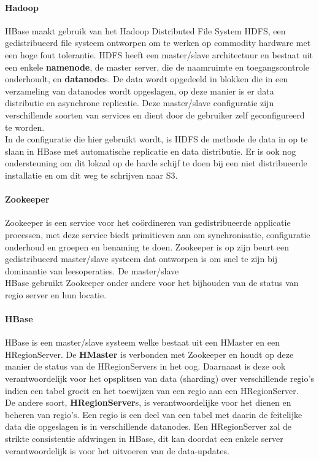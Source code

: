 \paragraph{Hadoop\cite{borthakur2007hadoop}} HBase maakt gebruik van het Hadoop Distributed File System \gls{HDFS}, een gedistribueerd file systeem ontworpen om te werken op commodity hardware met een hoge fout tolerantie. \gls{HDFS} heeft een master/slave architectuur en bestaat uit een enkele \textbf{namenode}, de master server, die de naamruimte en toegangscontrole onderhoudt, en \textbf{datanode}s. De data wordt opgedeeld in blokken die in een verzameling van datanodes wordt opgeslagen, op deze manier is er data distributie en asynchrone replicatie. Deze master/slave configuratie zijn verschillende soorten van services en dient door de gebruiker zelf geconfigureerd te worden. \\
In de configuratie die hier gebruikt wordt, is \gls{HDFS} de methode de data in op te slaan in HBase met automatische replicatie en data distributie. Er is ook nog ondersteuning om dit lokaal op de harde schijf te doen bij een niet distribueerde installatie en om dit weg te schrijven naar S3.\cite{george2011hbase}

\paragraph{Zookeeper\cite{hunt2010zookeeper}} Zookeeper is een service voor het coördineren van gedistribueerde applicatie processen, met deze service biedt primitieven aan om synchronisatie, configuratie onderhoud en groepen en benaming te doen. Zookeeper is op zijn beurt een gedistribueerd master/slave systeem dat ontworpen is om snel te zijn bij dominantie van leesoperaties. De master/slave \\
HBase gebruikt Zookeeper onder andere voor het bijhouden van de status van regio server en hun locatie. \cite{george2011hbase}

\paragraph{HBase\cite{george2011hbase}} HBase is een master/slave systeem welke bestaat uit een HMaster en een HRegionServer. De \textbf{HMaster} is verbonden met Zookeeper en houdt op deze manier de status van de HRegionServers in het oog. Daarnaast is deze ook verantwoordelijk voor het opsplitsen van data (sharding) over verschillende regio's indien een tabel groeit en het toewijzen van een regio aan een HRegionServer.\\
De andere soort, \textbf{HRegionServer}s, is verantwoordelijke voor het dienen en beheren van regio's. Een regio is een deel van een tabel met daarin de feitelijke data die opgeslagen is in verschillende datanodes. Een HRegionServer zal de strikte consistentie afdwingen in HBase, dit kan doordat een enkele server verantwoordelijk is voor het uitvoeren van de data-updates. 

